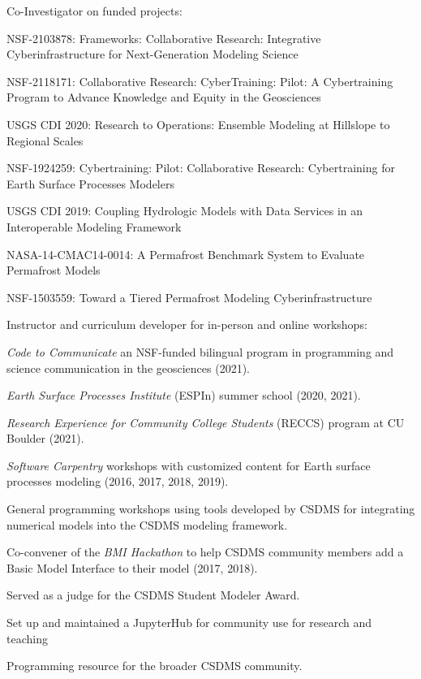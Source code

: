\begin{compactitem}[\itembullet]
  \item Co-Investigator on funded projects:
    \begin{compactitem}[\itembullet]
      \item
        NSF-2103878: Frameworks: Collaborative Research: Integrative
        Cyberinfrastructure for Next-Generation Modeling Science
      \item
        NSF-2118171: Collaborative Research: CyberTraining: Pilot: A
        Cybertraining Program to Advance Knowledge and Equity in the Geosciences
      \item
        USGS CDI 2020: Research to Operations: Ensemble Modeling at
        Hillslope to Regional Scales
      \item
        NSF-1924259: Cybertraining: Pilot: Collaborative Research:
        Cybertraining for Earth Surface Processes Modelers
      \item
        USGS CDI 2019: Coupling Hydrologic Models with Data Services
        in an Interoperable Modeling Framework
      \item
        NASA-14-CMAC14-0014: A Permafrost Benchmark System to Evaluate
        Permafrost Models
      \item
        NSF-1503559: Toward a Tiered Permafrost Modeling Cyberinfrastructure
    \end{compactitem}
  \item Instructor and curriculum developer for in-person and online workshops:
    \begin{compactitem}[\itembullet]
      \item
        \textit{Code to Communicate} an NSF-funded bilingual program in
        programming and science communication in the geosciences (2021).
      \item
        \textit{Earth Surface Processes Institute} (ESPIn) summer school (2020,
        2021).
      \item
        \textit{Research Experience for Community College Students} (RECCS)
        program at CU Boulder (2021).
      \item
        \textit{Software Carpentry} workshops with customized content for Earth
        surface processes modeling (2016, 2017, 2018, 2019).
      \item
        General programming workshops using tools developed by CSDMS for
        integrating numerical models into the CSDMS modeling framework.
    \end{compactitem}
    \item
    Co-convener of the \textit{BMI Hackathon} to help CSDMS
    community members add a Basic Model Interface to their model (2017, 2018).
  \item
    Served as a judge for the CSDMS Student Modeler Award.
  \item
    Set up and maintained a JupyterHub for community use for research
    and teaching
  \item
    Programming resource for the broader CSDMS community.
\end{compactitem}

